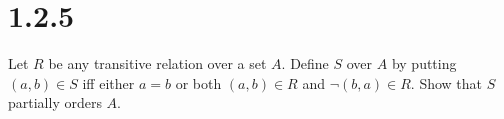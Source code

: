 \documentclass{article}
\begin{document}
\section*{1.2.5}
Let $R$ be any transitive relation over a set $A$. Define $S$ over $A$ by putting $(a,b) \in S$ iff either $a = b$ or both $(a,b) \in R$ and $\neg (b,a) \in R$. Show that $S$ partially orders $A$.
\end{document}
